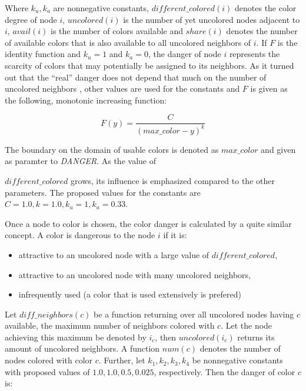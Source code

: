 Where $k_u, k_a$ are nonnegative constants, $\mathit{different\_colored}(i)$ denotes the color degree of node $i$, $\mathit{uncolored}(i)$ is the number of yet uncolored nodes adjacent to $i$, $\mathit{avail}(i)$ is the number of colors available and $\mathit{share}(i)$ denotes the number of available colors that is also available to all uncolored neighbors of $i$. If $F$ is the identity function and $k_u=1$ and $k_a=0$, the danger of node $i$ represents the scarcity of colors that may potentially be assigned to its neighbors. As it turned out that the ``real'' danger does not depend that much on the number of uncolored neighbors \cite{glover-96}, other values are used for the constants and $F$ is given as the following, monotonic increasing function:

$$ F(y) = \frac{C}{(\mathit{max\_color}-y)^k} $$

The boundary on the domain of usable colors is denoted as $\mathit{max\_color}$ and given as paramter to \textit{DANGER}. As the value of 

$\mathit{different\_colored}$ grows, its influence is emphasized compared to the other parameters. The proposed values for the constants are $C=1.0, k=1.0, k_u=1, k_a=0.33$.


Once a node to color is chosen, the color danger is calculated by a quite similar concept. A color is dangerous to the node $i$ if it is:

\begin{itemize}
\item attractive to an uncolored node with a large value of $\mathit{different\_colored}$,
\item attractive to an uncolored node with many uncolored neighbors,
\item infrequently used (a color that is used extensively is prefered)\cite{glover-96}
\end{itemize}

Let $\mathit{diff\_neighbors}(c)$ be a function returning over all uncolored nodes having $c$ available, the maximum number of neighbors colored with $c$. Let the node achieving this maximum be denoted by $i_c$, then $\mathit{uncolored}(i_c)$ returns its amount of uncolored neighbors. A function $num(c)$ denotes the number of nodes colored with color $c$. Further, let $k_1,k_2,k_3,k_4$ be nonnegative constants with proposed values of $1.0,1.0,0.5,0.025$, respectively. Then the danger of color $c$ is:

